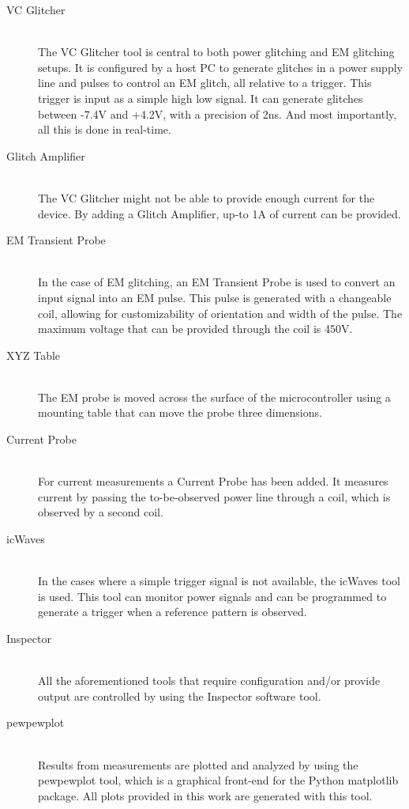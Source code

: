 \documentclass[10pt]{article}
\begin{document}
    \begin{description}
    \item[VC Glitcher] \ \\
    The VC Glitcher tool is central to both power glitching and EM glitching setups. It is configured by a host PC to generate glitches in a power supply line and pulses to control an EM glitch, all relative to a trigger. This trigger is input as a simple high low signal. It can generate glitches between -7.4V and +4.2V, with a precision of 2ns. And most importantly, all this is done in real-time.

    \item[Glitch Amplifier] \ \\
    The VC Glitcher might not be able to provide enough current for the device. By adding a Glitch Amplifier, up-to 1A of current can be provided.

    \item[EM Transient Probe] \ \\
    In the case of EM glitching, an EM Transient Probe is used to convert an input signal into an EM pulse. This pulse is generated with a changeable coil, allowing for customizability of orientation and width of the pulse. The maximum voltage that can be provided through the coil is 450V. 

    \item[XYZ Table] \ \\
    The EM probe is moved across the surface of the microcontroller using a mounting table that can move the probe three dimensions.

    \item[Current Probe] \ \\
    For current measurements a Current Probe has been added. It measures current by passing the to-be-observed power line through a coil, which is observed by a second coil.

    \item[icWaves] \ \\
    In the cases where a simple trigger signal is not available, the icWaves tool is used. This tool can monitor power signals and can be programmed  to generate a trigger when a reference pattern is observed. 

    \item[Inspector] \ \\
    All the aforementioned tools that require configuration and/or provide output are controlled by using the Inspector software tool.

    \item[pewpewplot] \ \\
    Results from measurements are plotted and analyzed by using the pewpewplot tool, which is a graphical front-end for the Python matplotlib package. All plots provided in this work are generated with this tool.

    \end{description}
\end{document}
